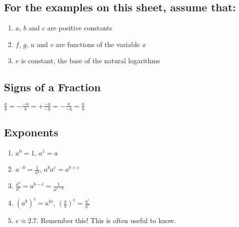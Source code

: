 \documentclass[12pt]{article}
\begin{document}
\date{}
\maketitle

\subsection{For the examples on this sheet, assume that:}
\begin{enumerate}
\item{} $a$, $b$ and $c$ are positive constants
\item{} $f$, $g$, $u$ and $v$ are functions of the variable $x$
\item{} $e$ is constant, the base of the natural logarithms
\end{enumerate}

\subsection{Signs of a Fraction}
$\frac{a}{b} = -\frac{-a}{b} = +\frac{-a}{-b} = -\frac{a}{-b} = \frac{a}{b}$

\subsection{Exponents}
\begin{enumerate}
\item{} $a^{0} = 1$, $a^{1} = a$
\item{} $a^{-b} = \frac{1}{a^{b}}$, $a^{b}a^{c} = a^{b+c}$
\item{} $\frac{a^{b}}{a^{c}} = a^{b-c} = \frac{1}{a^{c-b}}$
\item{} $(a^{b})^{c} = a^{bc}$, $(\frac{a}{b})^{c} = \frac{a^{c}}{b^{c}}$
\item{} $e \approx 2.7$. Remember this! This is often useful to know.
\end{enumerate}
\end{document}
